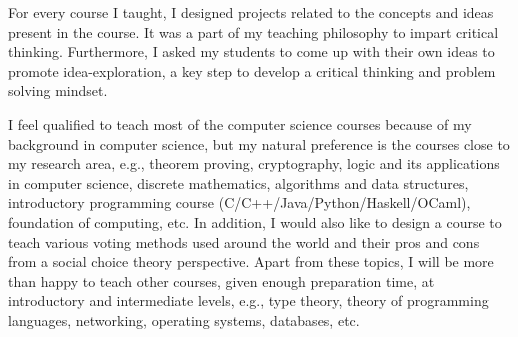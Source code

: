 \documentclass[a4paper]{article}
\begin{document}
For every course I taught, I designed projects related to the concepts 
and ideas present in the course. It was a part of my teaching philosophy to impart 
critical thinking. Furthermore, I asked my students to come up with their own ideas to 
promote idea-exploration, a key step to develop a critical thinking and problem solving mindset. 


I feel qualified to teach most of the computer science courses 
because of my background in computer science, but 
my natural preference is the courses close to my research 
area, e.g., theorem proving, cryptography, logic 
and its applications in computer science, discrete 
mathematics, algorithms and data structures, 
introductory programming course (C/C++/Java/Python/Haskell/OCaml),
foundation of computing, etc. 
In addition, I would also like to design a course to teach 
various voting methods used around the world and 
their pros and cons from a social choice theory perspective. 
Apart from these topics, I will 
be more than happy to teach other courses, given enough 
preparation time, at introductory and 
intermediate levels, e.g., type theory, theory of programming 
languages, networking, operating systems, databases, etc.
\end{document}
